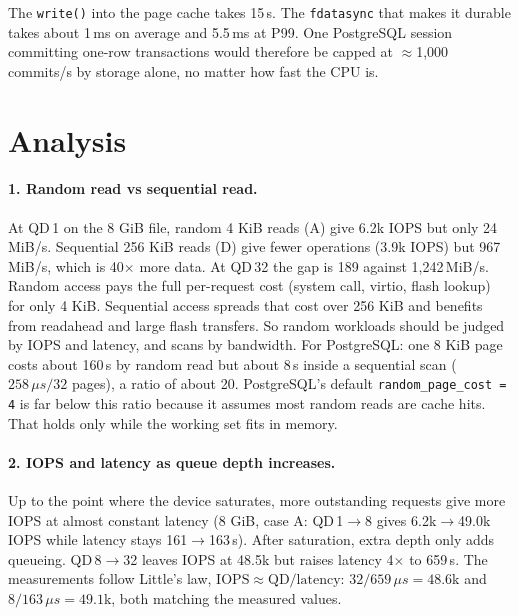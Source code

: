 \documentclass[11pt,a4paper]{article}
\begin{document}
The \texttt{write()} into the page cache takes 15\,\textmu s. The \texttt{fdatasync} that makes it durable
takes about 1\,ms on average and 5.5\,ms at P99. One PostgreSQL session committing one-row
transactions would therefore be capped at $\approx$1{,}000 commits/s by storage alone, no matter how fast the CPU is.

\section{Analysis}

\paragraph{1. Random read vs sequential read.}
At QD\,1 on the 8 GiB file, random 4 KiB reads (A) give 6.2k IOPS but only 24\,MiB/s.
Sequential 256 KiB reads (D) give fewer operations (3.9k IOPS) but 967\,MiB/s, which is 40$\times$ more data.
At QD\,32 the gap is 189 against 1{,}242\,MiB/s. Random access pays the full per-request cost (system call,
virtio, flash lookup) for only 4 KiB. Sequential access spreads that cost over 256 KiB and benefits from readahead
and large flash transfers. So random workloads should be judged by IOPS and latency, and scans by bandwidth.
For PostgreSQL: one 8 KiB page costs about 160\,\textmu s by random read but about 8\,\textmu s inside a
sequential scan ($258\,\mu s / 32$ pages), a ratio of about 20. PostgreSQL's default
\texttt{random\_page\_cost = 4} is far below this ratio because it assumes most random reads are cache hits.
That holds only while the working set fits in memory.

\paragraph{2. IOPS and latency as queue depth increases.}
Up to the point where the device saturates, more outstanding requests give more IOPS at almost
constant latency (8 GiB, case A: QD\,1$\to$8 gives 6.2k$\to$49.0k IOPS while latency stays 161$\to$163\,\textmu s).
After saturation, extra depth only adds queueing. QD\,8$\to$32 leaves IOPS at 48.5k but raises latency
4$\times$ to 659\,\textmu s. The measurements follow Little's law,
$\mathrm{IOPS} \approx \mathrm{QD} / \mathrm{latency}$: $32 / 659\,\mu s = 48.6$k and $8/163\,\mu s = 49.1$k, both
matching the measured values.
\end{document}
